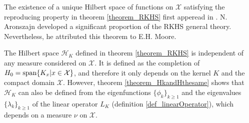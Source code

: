 \begin{remark}
  The existence of a unique Hilbert space of functions on $\mathcal{X}$ satisfying the reproducing property in theorem \ref{theorem_RKHS} first apperead in \textcite{aronszajn1950a}. N. Aronszajn developed a significant proportion of the RKHS general theory. Nevertheless, he attributed this theorem to E.H. Moore.
\end{remark}

\begin{remark}
  The Hilbert space $\mathcal{H}_K$ defined in theorem \ref{theorem_RKHS} is independent of any measure considered on $\mathcal{X}$. It is defined as the completion of $H_0 = \textup{span}\{K_x | x \in \mathcal{X} \}$, and therefore it only depends on the kernel $K$ and the compact domain $\mathcal{X}$. However, theorem \ref{theorem_HkandHthesame} shows that $\mathcal{H}_K$ can also be defined from the eigenfunctions $\{\phi_k\}_{k \geq 1}$ and the eigenvalues $\{\lambda_k\}_{k \geq 1}$ of the linear operator $L_K$ (definition \ref{def_linearOperator}), which depends on a measure $\nu$ on $\mathcal{X}$. 
\end{remark}

